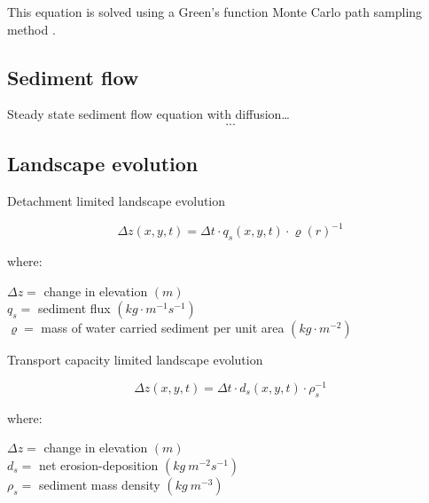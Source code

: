 \documentclass[final,3p,times,twocolumn]{elsarticle}
\begin{document}
This equation is solved using a Green's function Monte Carlo path sampling method \cite{mitasova2004}.





\subsection{Sediment flow}

Steady state sediment flow equation with diffusion\ldots
\begin{equation}\label{eq:sediment} 
...
\end{equation}


\subsection{Landscape evolution}


Detachment limited landscape evolution

\begin{equation}\label{eq:flux_evolution} 
{\Delta z(x,y,t) = \Delta t \cdot q_s(x,y,t) \cdot \varrho(r)^{-1} }
\end{equation}

where: 

$\Delta z =$ change in elevation $(m)$ \\
$q_s =$ sediment flux $(kg \cdot m^{-1} s^{-1})$ \\
$\varrho =$ mass of water carried sediment per unit area $(kg \cdot m^{-2})$ \\
\vspace{1em}

Transport capacity limited landscape evolution

\begin{equation}\label{eq:evolution} 
{\Delta z(x,y,t) = \Delta t \cdot d_s(x,y,t) \cdot \rho_s^{-1} }
\end{equation}

where: 

$\Delta z =$ change in elevation $(m)$ \\
$d_s =$ net erosion-deposition $(kg ~ m^{-2} s^{-1})$ \\
$\rho_s =$ sediment mass density $(kg ~m^{-3})$ \\
\vspace{1em}
\end{document}
